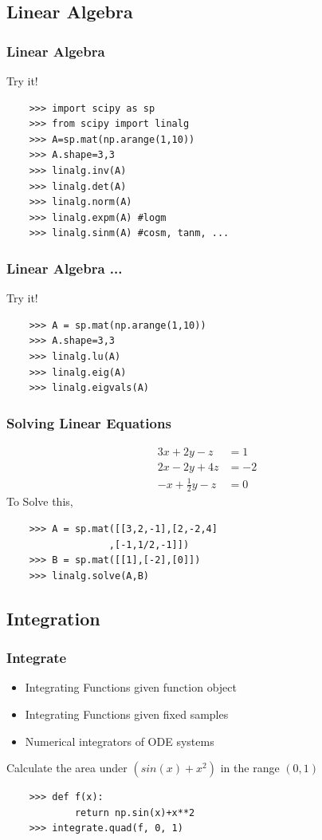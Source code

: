 \documentclass[14pt,compress]{beamer}
\newcounter{time}
\newcommand{\inctime}[1]{\addtocounter{time}{#1}{\tiny \thetime\ m}}
\begin{document}
\subsection{Linear Algebra}
\begin{frame}[fragile]
  \frametitle{Linear Algebra}
  Try it!
  \begin{lstlisting}
    >>> import scipy as sp
    >>> from scipy import linalg
    >>> A=sp.mat(np.arange(1,10))
    >>> A.shape=3,3
    >>> linalg.inv(A)
    >>> linalg.det(A)
    >>> linalg.norm(A)
    >>> linalg.expm(A) #logm
    >>> linalg.sinm(A) #cosm, tanm, ...
  \end{lstlisting}
\end{frame}

\begin{frame}[fragile]
  \frametitle{Linear Algebra ...}
  Try it!
  \begin{lstlisting}
    >>> A = sp.mat(np.arange(1,10))
    >>> A.shape=3,3
    >>> linalg.lu(A)
    >>> linalg.eig(A)
    >>> linalg.eigvals(A)
  \end{lstlisting}
\end{frame}

\begin{frame}[fragile]
  \frametitle{Solving Linear Equations}
  \begin{align*}
    3x + 2y - z  & = 1 \\
    2x - 2y + 4z  & = -2 \\
    -x + \frac{1}{2}y -z & = 0
  \end{align*}
  To Solve this, 
  \begin{lstlisting}
    >>> A = sp.mat([[3,2,-1],[2,-2,4]
                  ,[-1,1/2,-1]])
    >>> B = sp.mat([[1],[-2],[0]])
    >>> linalg.solve(A,B)
  \end{lstlisting}
\inctime{15}
\end{frame}

\subsection{Integration}
\begin{frame}[fragile]
  \frametitle{Integrate}
  \begin{itemize}
    \item Integrating Functions given function object
    \item Integrating Functions given fixed samples
    \item Numerical integrators of ODE systems
  \end{itemize}
  Calculate the area under $(sin(x) + x^2)$ in the range $(0,1)$
  \begin{lstlisting}
    >>> def f(x):
            return np.sin(x)+x**2
    >>> integrate.quad(f, 0, 1)
  \end{lstlisting}
\end{frame}
\end{document}
